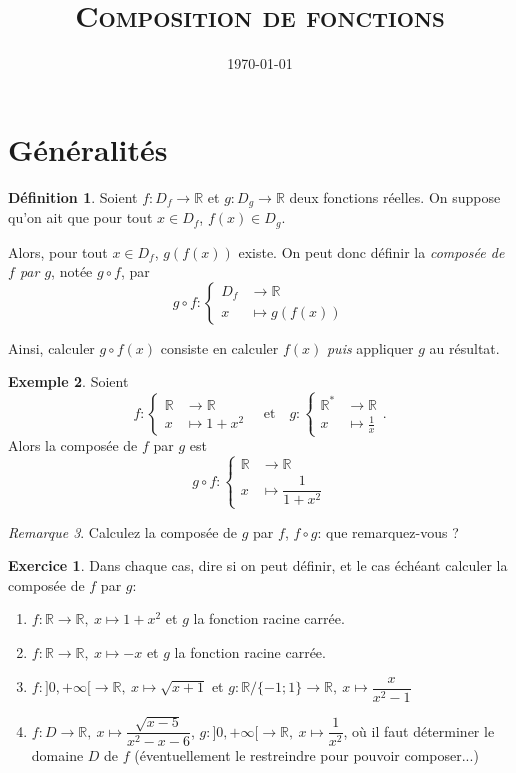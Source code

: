 \documentclass{article}
\title{\textsc{Composition de fonctions} }
\author{}
\date{\today}
\theoremstyle{definition}
\newtheorem{mydef}{Définition}[section]
\newtheorem{exo}{Exercice}
\newtheorem{exe}[mydef]{Exemple}
\theoremstyle{remark}
\newtheorem{rem}[mydef]{Remarque}
\theoremstyle{theorem}
\newcommand{\RR}{\mathbb R}
\begin{document}
\maketitle

\section{Généralités}

\begin{mydef}
Soient $f:D_f\longrightarrow\RR$ et $g:D_g\longrightarrow\RR$ deux fonctions réelles. On suppose qu'on ait que pour tout $x\in D_f$, $f(x)\in D_g$. 

Alors, pour tout $x\in D_f$, $g(f(x))$ existe. On peut donc définir la \textit{composée de $f$ par $g$}, notée $g\circ f$, par
\[
g\circ f:\begin{cases}
D_f &\longrightarrow \RR \\
x &\longmapsto g(f(x)) 
\end{cases}
\]
\end{mydef}

Ainsi, calculer $g\circ f(x)$ consiste en calculer $f(x)$ \textit{puis} appliquer $g$ au résultat.

\begin{exe}
Soient 
\[
f:\begin{cases}
\RR &\longrightarrow\RR \\
x &\longmapsto 1+x^2
\end{cases}
\quad\textrm{et} \quad
g:\begin{cases}
\RR^* &\longrightarrow \RR \\
x &\longmapsto \frac 1 x
\end{cases}.
\]
Alors la composée de $f$ par $g$ est
\[
g\circ f:\begin{cases}
\RR&\longrightarrow\RR \\
x &\longmapsto \dfrac{1}{1+x^2}
\end{cases}
\]
\end{exe}

\begin{rem}
Calculez la composée de $g$ par $f$, $f\circ g$: que remarquez-vous ?
\end{rem}

\begin{exo}
Dans chaque cas, dire si on peut définir, et le cas échéant calculer la composée de $f$ par $g$:
\begin{enumerate}
\item $f:\RR\longrightarrow\RR,\ x\longmapsto 1+x^2$ et $g$ la fonction racine carrée.
\item $f:\RR\longrightarrow\RR,\ x\longmapsto -x$ et $g$ la fonction racine carrée.
\item $f:{]0,+\infty[}\longrightarrow\RR,\ x\longmapsto \sqrt{x+1}$ et $g:\RR/\{-1;1\}\longrightarrow\RR,\ x\longmapsto \dfrac{x}{x^2-1}$
\item $f:D\longrightarrow\RR,\ x\longmapsto \dfrac{\sqrt{x-5}}{x^2-x-6}$, $g:{]0,+\infty[}\longrightarrow\RR,\ x\longmapsto \dfrac{1}{x^2}$, où il faut déterminer le domaine $D$ de $f$ (éventuellement le restreindre pour pouvoir composer...)
\end{enumerate}
\end{exo}
\end{document}
